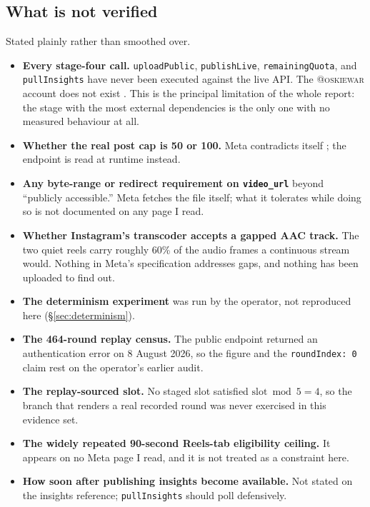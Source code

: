 \documentclass[10pt,letterpaper,twocolumn]{article}
\newcommand{\code}[1]{\texttt{#1}}
\begin{document}
\subsection{What is not verified}

Stated plainly rather than smoothed over.

\begin{itemize}
  \item \textbf{Every stage-four call.} \code{uploadPublic}, \code{publishLive},
    \code{remainingQuota}, and \code{pullInsights} have never been executed
    against the live API. The \textsc{@oskiewar} account does not exist
    \cite{acsocial}. This is the principal limitation of the whole report: the
    stage with the most external dependencies is the only one with no measured
    behaviour at all.
  \item \textbf{Whether the real post cap is 50 or 100.} Meta contradicts itself
    \cite{metaPublishing,metaLimit}; the endpoint is read at runtime instead.
  \item \textbf{Any byte-range or redirect requirement on \code{video\_url}}
    beyond ``publicly accessible.'' Meta fetches the file itself; what it
    tolerates while doing so is not documented on any page I read.
  \item \textbf{Whether Instagram's transcoder accepts a gapped AAC track.} The
    two quiet reels carry roughly 60\% of the audio frames a continuous stream
    would. Nothing in Meta's specification addresses gaps, and nothing has been
    uploaded to find out.
  \item \textbf{The determinism experiment} was run by the operator, not
    reproduced here (\S\ref{sec:determinism}).
  \item \textbf{The 464-round replay census.} The public endpoint returned an
    authentication error on 8 August 2026, so the figure and the
    \code{roundIndex: 0} claim rest on the operator's earlier audit.
  \item \textbf{The replay-sourced slot.} No staged slot satisfied
    $\text{slot} \bmod 5 = 4$, so the branch that renders a real recorded round
    was never exercised in this evidence set.
  \item \textbf{The widely repeated 90-second Reels-tab eligibility ceiling.} It
    appears on no Meta page I read, and it is not treated as a constraint here.
  \item \textbf{How soon after publishing insights become available.} Not stated
    on the insights reference; \code{pullInsights} should poll defensively.
\end{itemize}
\end{document}
